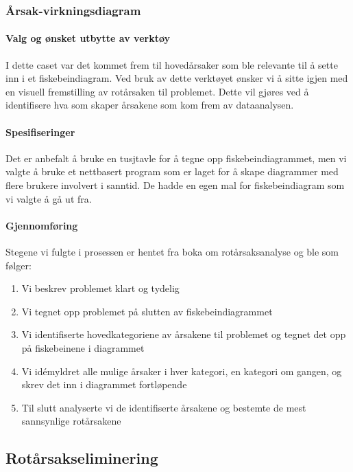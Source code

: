 \subsubsection{Årsak-virkningsdiagram}

\paragraph{Valg og ønsket utbytte av verktøy}
I dette caset var det kommet frem til hovedårsaker som ble relevante til å sette inn i et fiskebeindiagram. Ved bruk av dette verktøyet ønsker vi å sitte igjen med en visuell fremstilling av rotårsaken til problemet. Dette vil gjøres ved å identifisere hva som skaper årsakene som kom frem av dataanalysen. 

\paragraph{Spesifiseringer}
Det er anbefalt å bruke en tusjtavle for å tegne opp fiskebeindiagrammet, men vi valgte å bruke et nettbasert program som er laget for å skape diagrammer med flere brukere involvert i sanntid. De hadde en egen mal for fiskebeindiagram som vi valgte å gå ut fra.

\paragraph{Gjennomføring}
Stegene vi fulgte i prosessen er hentet fra boka om rotårsaksanalyse \cite{RCA} og ble som følger:

\begin{enumerate}
    \item Vi beskrev problemet klart og tydelig
    \item Vi tegnet opp problemet på slutten av fiskebeindiagrammet
    \item Vi identifiserte hovedkategoriene av årsakene til problemet og tegnet det opp på fiskebeinene i diagrammet
    \item Vi idémyldret alle mulige årsaker i hver kategori, en kategori om gangen, og skrev det inn i diagrammet fortløpende
    \item Til slutt analyserte vi de identifiserte årsakene og bestemte de mest sannsynlige rotårsakene
\end{enumerate}


\subsection{Rotårsakseliminering}

